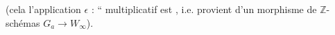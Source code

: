 (cela {} l'application $\epsilon$ : ``{} multiplicatif est {}, i.e. provient d'un morphisme de $\mathbb{Z}$-schémas $G_a\longrightarrow W_\infty$).
